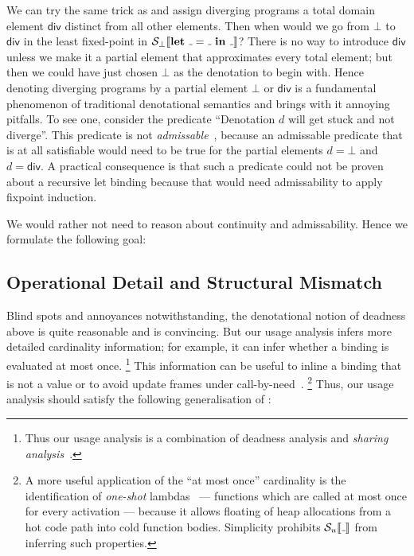 We can try the same trick as \citeauthor{Milner:78} and assign diverging
programs a total domain element $\mathsf{div}$ distinct from all other elements.
Then when would we go from $\bot$ to $\mathsf{div}$ in the least fixed-point in
$\semscott{\Let{\wild}{\wild}{\wild}}$?
There is no way to introduce $\mathsf{div}$ unless we make it a partial element
that approximates every total element; but then we could have just chosen $\bot$
as the denotation to begin with.
Hence denoting diverging programs by a partial element $\bot$ or $\mathsf{div}$
is a fundamental phenomenon of traditional denotational semantics and brings
with it annoying pitfalls.
To see one, consider the predicate ``Denotation $d$ will get stuck and not
diverge''.
This predicate is not \emph{admissable}~\citep{Abramsky:94}, because an
admissable predicate that is at all satisfiable would need to be true for
the partial elements $d=\bot$ and $d=\mathsf{div}$.
A practical consequence is that such a predicate could not be proven about a
recursive let binding because that would need admissability to apply fixpoint
induction.

We would rather not need to reason about continuity and admissability.
Hence we formulate the following goal:


\subsection{Operational Detail and Structural Mismatch}

Blind spots and annoyances notwithstanding, the denotational notion of deadness
above is quite reasonable and  is convincing.
But our usage analysis infers more detailed cardinality information;
for example, it can infer whether a binding is evaluated at most once.%
\footnote{Thus our usage analysis is a combination of deadness analysis
and \emph{sharing analysis}~\citep{Gustavsson:98}.}
This information can be useful to inline a binding that is not a value or
to avoid update frames under call-by-need~\citep{cardinality-ext}.%
\footnote{A more useful application of the ``at most once'' cardinality is the
identification of \emph{one-shot} lambdas~\citep{cardinality-ext} --- functions which are
called at most once for every activation --- because it allows floating of heap
allocations from a hot code path into cold function bodies.
Simplicity prohibits $\semusg{\wild}$ from inferring such properties.}
Thus, our usage analysis should satisfy the following generalisation of
:

